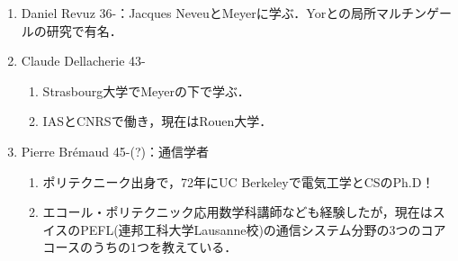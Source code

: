 \documentclass[uplatex,dvipdfmx]{jsreport}
\begin{document}
\begin{history}[France学派]
\begin{enumerate}
\begin{enumerate}
        \end{enumerate}
        \item Daniel Revuz 36-：Jacques NeveuとMeyerに学ぶ．Yorとの局所マルチンゲールの研究で有名．
        \item Claude Dellacherie 43-
        \begin{enumerate}
            \item Strasbourg大学でMeyerの下で学ぶ．
            \item IASとCNRSで働き，現在はRouen大学．
        \end{enumerate}
        \item Pierre Brémaud 45-(?)：通信学者
        \begin{enumerate}
            \item ポリテクニーク出身で，72年にUC Berkeleyで電気工学とCSのPh.D！
            \item エコール・ポリテクニック応用数学科講師なども経験したが，現在はスイスのPEFL(連邦工科大学Lausanne校)の通信システム分野の3つのコアコースのうちの1つを教えている．
        \end{enumerate}
    \end{enumerate}
\end{history}
\end{document}
